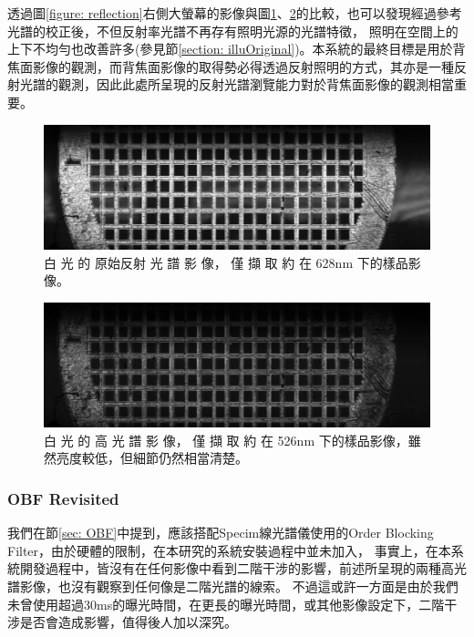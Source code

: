\documentclass[12pt]{article}
\begin{document}
透過圖\ref{figure: reflection}右側大螢幕的影像與圖\ref{fig: reflec628}、\ref{fig: reflec526}的比較，也可以發現經過參考光譜的校正後，不但反射率光譜不再存有照明光源的光譜特徵，
照明在空間上的上下不均勻也改善許多(參見節\ref{section: illuOriginal})。本系統的最終目標是用於背焦面影像的觀測，而背焦面影像的取得勢必得透過反射照明的方式，其亦是一種反射光譜的觀測，因此此處所呈現的反射光譜瀏覽能力對於背焦面影像的觀測相當重要。

\begin{figure}
    \centering
    \includegraphics[width = 0.9\linewidth]{1211_10um_10ms-1.jpg}
    \caption{白 光 的 原始反射 光 譜 影 像， 僅 擷 取 約 在
    628nm 下的樣品影像。}
    \label{fig: reflec628}
\end{figure}

\begin{figure}
    \centering
    \includegraphics[width = 0.9\linewidth]{1211_10um_10ms137-1.jpg}
    \caption[白 光 的 原始反射 光 譜 影 像， 僅 擷 取 約 在
    526nm 下的樣品影像]{白 光 的 高 光 譜 影 像， 僅 擷 取 約 在
    526nm 下的樣品影像，雖然亮度較低，但細節仍然相當清楚。}
    \label{fig: reflec526}
\end{figure}

\subsubsection{OBF Revisited}
我們在節\ref{sec: OBF}中提到，應該搭配Specim線光譜儀使用的Order Blocking Filter，由於硬體的限制，在本研究的系統安裝過程中並未加入，
事實上，在本系統開發過程中，皆沒有在任何影像中看到二階干涉的影響，前述所呈現的兩種高光譜影像，也沒有觀察到任何像是二階光譜的線索。
不過這或許一方面是由於我們未曾使用超過30ms的曝光時間，在更長的曝光時間，或其他影像設定下，二階干涉是否會造成影響，值得後人加以深究。
\end{document}
